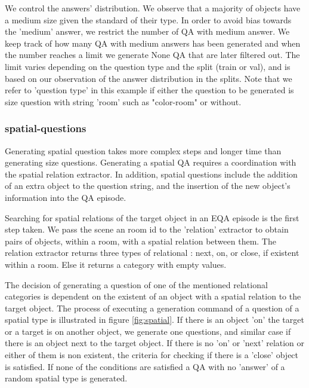 We control the answers' distribution. We observe that a majority of objects have a medium size given the standard of their type. In order to avoid bias towards the 'medium' answer, we restrict the number of QA with medium answer. We keep track of how many QA with medium answers has been generated and when the number reaches a limit we generate None QA that are later filtered out. The limit varies depending on the question type and the split (train or val), and is based on our observation of the answer distribution in the splits. Note that we refer to 'question type' in this example if either the question to be generated is size question with string 'room' such as "color-room" or without. 



\subsubsection{spatial-questions}

Generating spatial question takes more complex steps and longer time than generating size questions. Generating a spatial QA requires a coordination with the spatial relation extractor. In addition, spatial questions include the addition of an extra object to the question string, and the insertion of the new object's information into the QA episode. 

Searching for spatial relations of the target object in an EQA episode is the first step taken. We pass the scene an room id to the 'relation' extractor to obtain pairs of objects, within a room,  with a spatial relation between them. The relation extractor returns three types of relational : next, on, or close, if existent within a room. Else it returns a category with empty values. 

The decision of generating a question of one of the mentioned relational categories is dependent on the existent of an object with a spatial relation to the target object. The process of executing a generation command of a question of a spatial type is illustrated in figure \ref{fig:spatial}. If there is an object 'on' the target or a target is on another object, we generate one questions, and similar case if there is an object next to the target object. If there is no 'on' or 'next' relation or either of them is non existent, the criteria for checking if there is a 'close' object is satisfied. If none of the conditions are satisfied a QA with no 'answer' of a random spatial type is generated.   


